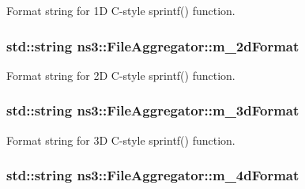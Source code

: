 Format string for 1D C-\/style sprintf() function. 

\subsubsection[{\texorpdfstring{m\+\_\+2d\+Format}{m_2dFormat}}]{\setlength{\rightskip}{0pt plus 5cm}std\+::string ns3\+::\+File\+Aggregator\+::m\+\_\+2d\+Format\hspace{0.3cm}{\ttfamily [private]}}\hypertarget{classns3_1_1FileAggregator_af26ec05f2349691c0d436d8e15de1831}{}\label{classns3_1_1FileAggregator_af26ec05f2349691c0d436d8e15de1831}


Format string for 2D C-\/style sprintf() function. 

\subsubsection[{\texorpdfstring{m\+\_\+3d\+Format}{m_3dFormat}}]{\setlength{\rightskip}{0pt plus 5cm}std\+::string ns3\+::\+File\+Aggregator\+::m\+\_\+3d\+Format\hspace{0.3cm}{\ttfamily [private]}}\hypertarget{classns3_1_1FileAggregator_ab86ae12895719cfb867e102706858cec}{}\label{classns3_1_1FileAggregator_ab86ae12895719cfb867e102706858cec}


Format string for 3D C-\/style sprintf() function. 

\subsubsection[{\texorpdfstring{m\+\_\+4d\+Format}{m_4dFormat}}]{\setlength{\rightskip}{0pt plus 5cm}std\+::string ns3\+::\+File\+Aggregator\+::m\+\_\+4d\+Format\hspace{0.3cm}{\ttfamily [private]}}\hypertarget{classns3_1_1FileAggregator_a388f2825222368149d5b0abf1bc6b781}{}\label{classns3_1_1FileAggregator_a388f2825222368149d5b0abf1bc6b781}


